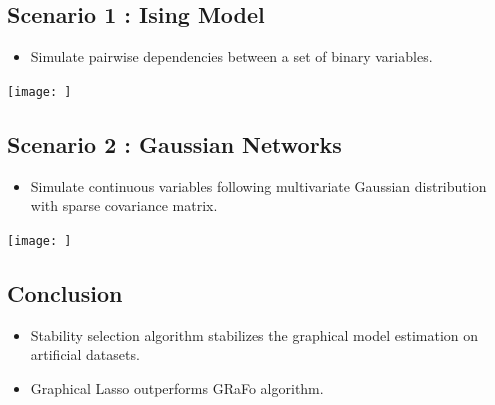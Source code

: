 \documentclass[landscape,a0paper,fontscale=0.285]{baposter} %
\newcommand{\compresslist}{ %
\setlength{\itemsep}{1pt}
\setlength{\parskip}{0pt}
\setlength{\parsep}{0pt}
}
\begin{document}
\begin{poster}
{\begin{multicols}{2}
\begin{center}
\subsection*{Scenario 1 : Ising Model}
\end{center}

\begin{itemize}\compresslist
\item Simulate pairwise dependencies between a set of binary variables.
\end{itemize}

\begin{center}
\texttt{[image: ]}
\end{center}



\begin{center}
\subsection*{Scenario 2 : Gaussian Networks}
\end{center}


\begin{itemize}\compresslist
\item Simulate continuous variables following multivariate Gaussian distribution with sparse covariance matrix.
\end{itemize}

\begin{center}
\texttt{[image: ]}
\end{center}

\end{multicols}

\vspace{-1 cm}
\begin{center}
\subsection*{Conclusion}
\end{center}

\begin{itemize}\compresslist
\item Stability selection algorithm stabilizes the graphical model estimation on artificial datasets.
\item Graphical Lasso outperforms GRaFo algorithm.
\end{itemize}
}


\end{poster}
\end{document}
